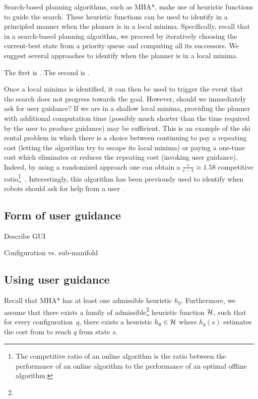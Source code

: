 \documentclass[conference]{IEEEtran}
\begin{document}
Search-based planning algorithms, such as MHA*, make use of heuristic functions to guide the search. These heuristic functions can be used to identify in a principled manner when the planner is in a local minima. 
Specifically, recall that in a search-based planning algorithm,  we proceed by iteratively choosing  the current-best state from a priority queue and computing all its successors. We suggest several approaches to identify when the planner is in a local minima.

The first is .
The second is .

Once a local minima is identified, it can then be used to trigger the event that the search does not progress towards the goal. 
However, should we immediately ask for user guidance? If we are in a shallow local minima, providing the planner with additional computation time (possibly much shorter than the time required by the user to produce guidance) may be sufficient.
This is an example of the ski rental problem in which there is a choice between continuing to pay a repeating cost (letting the algorithm try to escape its local minima) or paying a one-time cost which eliminates or reduces the repeating cost (invoking user guidance).
Indeed, by using a randomized approach one can obtain a $\frac{e}{e-1}\approx1.58$ competitive ratio\footnote{The competitive ratio of an online algorithm is the ratio between the performance of an online algorithm to the performance of an optimal offline algorithm.}~\cite{KMMO94}.
Interestingly, this algorithm has been previously used to identify when robots should ask for help from a user~\cite{RV12}.

\subsection{Form of user guidance}
Describe GUI

Configuration vs. sub-manifold


\subsection{Using user guidance}
Recall that MHA* has at least one admissible heuristic $h_{0}$.
Furthermore, we assume that there exists a family of admissible\footnote{} heuristic function $\mathcal{H}$, such that for every configuration~$q$, there exists a heuristic $h_q \in \mathcal{H}$ where $h_q(s)$ estimates the cost from to reach $q$ from state $s$.
\end{document}
